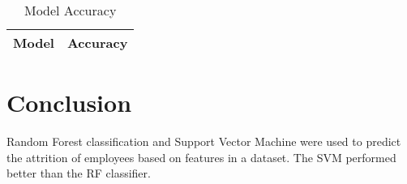 \documentclass{article} %
\begin{document}
\begin{table}[h]
    \centering
    \caption{Model Accuracy}
    \label{tab:model_accuracy}
    \begin{tabular}{ll}
        \toprule
        Model & Accuracy \\
        \midrule
        \bottomrule
    \end{tabular}
\end{table}

\section{Conclusion}

Random Forest classification and Support Vector Machine were used to predict the attrition of employees based on features in a dataset. The SVM performed better than the RF classifier.
\end{document}
